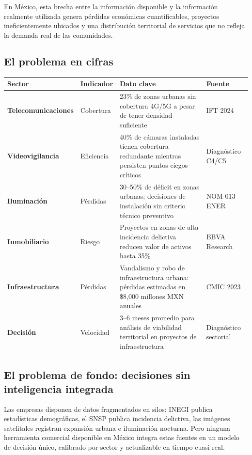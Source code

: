 \documentclass[12pt,a4paper]{article}
\begin{document}
En México, esta brecha entre la información disponible y la información realmente utilizada genera pérdidas económicas cuantificables, proyectos ineficientemente ubicados y una distribución territorial de servicios que no refleja la demanda real de las comunidades.

\subsection{El problema en cifras}

\begin{table}[H]
\centering
\small
\renewcommand{\arraystretch}{1.3}
\begin{tabularx}{\textwidth}{>{\bfseries}l l X l}
\toprule
\rowcolor{grisoscuro}
\color{white}\textbf{Sector} & \color{white}\textbf{Indicador} & \color{white}\textbf{Dato clave} & \color{white}\textbf{Fuente} \\
\midrule
Telecomunicaciones & Cobertura & 23\% de zonas urbanas sin cobertura 4G/5G a pesar de tener densidad suficiente & IFT 2024 \\
\rowcolor{fondofila}
Videovigilancia & Eficiencia & 40\% de cámaras instaladas tienen cobertura redundante mientras persisten puntos ciegos críticos & Diagnóstico C4/C5 \\
Iluminación & Pérdidas & 30–50\% de déficit en zonas urbanas; decisiones de instalación sin criterio técnico preventivo & NOM-013-ENER \\
\rowcolor{fondofila}
Inmobiliario & Riesgo & Proyectos en zonas de alta incidencia delictiva reducen valor de activos hasta 35\% & BBVA Research \\
Infraestructura & Pérdidas & Vandalismo y robo de infraestructura urbana: pérdidas estimadas en \$8{,}000 millones MXN anuales & CMIC 2023 \\
\rowcolor{fondofila}
Decisión & Velocidad & 3–6 meses promedio para análisis de viabilidad territorial en proyectos de infraestructura & Diagnóstico sectorial \\
\bottomrule
\end{tabularx}
\end{table}

\subsection{El problema de fondo: decisiones sin inteligencia integrada}

Las empresas disponen de datos fragmentados en silos: INEGI publica estadísticas demográficas, el SNSP publica incidencia delictiva, las imágenes satelitales registran expansión urbana e iluminación nocturna. Pero ninguna herramienta comercial disponible en México integra estas fuentes en un modelo de decisión único, calibrado por sector y actualizable en tiempo cuasi-real.
\end{document}
